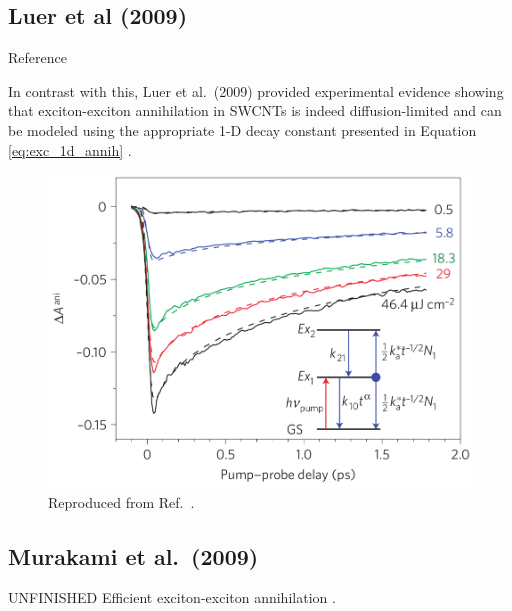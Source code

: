 \subsection{Luer et al (2009)}
Reference \cite{luer2009size}

In contrast with this, Luer et al.\ (2009) provided experimental evidence showing that exciton-exciton annihilation in SWCNTs is indeed diffusion-limited and can be modeled using the appropriate 1-D decay constant presented in Equation \eqref{eq:exc_1d_annih} \cite{luer2009size}.

\begin{figure}
	\centering
	\includegraphics[scale=1.2]{images/chapter_prior_works/dtt_2_luer_2009}
	\caption{Reproduced from Ref.\ \cite{luer2009size}.}
	\label{fig:dtt_luer_2009}
\end{figure}


\subsection{Murakami et al.\ (2009)}
{\color{red} UNFINISHED} Efficient exciton-exciton annihilation \cite{murakami2009existence}.






